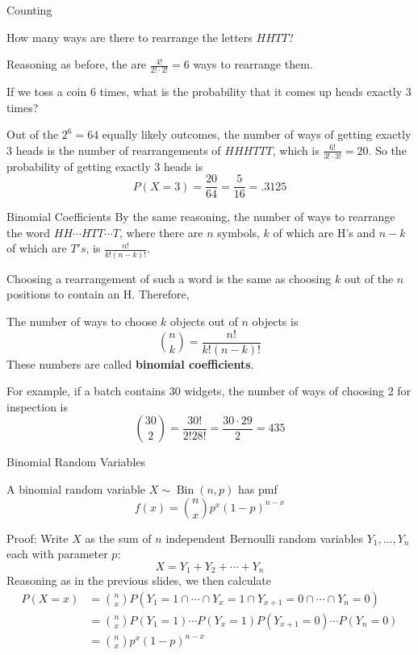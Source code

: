 \documentclass[xcolor=table]{beamer}
\DeclareMathOperator{\Bin}{Bin}
\renewcommand{\emph}{\textbf}
\begin{document}
\begin{frame}{Counting}
\begin{block}{}
How many ways are there to rearrange the letters $HHTT$?
\end{block}

\pause\vspace{.2cm}
Reasoning as before, the are $\frac{4!}{2!\cdot 2!} = 6$ ways to rearrange them.
\pause\begin{block}{}
If we toss a coin 6 times, what is the probability that it comes up heads exactly 3 times?
\end{block}
\pause Out of the $2^6=64$ equally likely outcomes, the number of ways of getting exactly 3 heads is the number of rearrangements of $HHHTTT$, which is $\frac{6!}{3!\cdot 3!} = 20$. So the probability of getting exactly 3 heads is
$$P(X=3) = \frac{20}{64} = \frac5{16} = .3125$$
\end{frame}

\begin{frame}{Binomial Coefficients}
By the same reasoning, the number of ways to rearrange the word $HH\cdots HTT\cdots T$, where there are $n$ symbols, $k$ of which are H's and $n-k$ of which are $T's$, is $\frac{n!}{k!(n-k)!}$.

\vspace{.2cm}
\pause Choosing a rearrangement of such a word is the same as choosing $k$ out of the $n$ positions to contain an H. \pause Therefore,

\begin{block}{}The number of ways to choose $k$ objects out of $n$ objects is
$$\binom n k = \frac{n!}{k!(n-k)!}$$
These numbers are called \emph{binomial coefficients}.
\end{block}

\pause For example, if a batch contains 30 widgets, the number of ways of choosing 2 for inspection is $$\binom{30}2 = \frac{30!}{2!28!} = \frac{30\cdot 29}{2} = 435$$
\end{frame}

\begin{frame}{Binomial Random Variables}
\begin{block}{}
A binomial random variable $X\sim \Bin(n,p)$ has pmf
$$f(x) = \binom{n}{x}p^x(1-p)^{n-x}$$
\end{block}
Proof: Write $X$ as the sum of $n$ independent Bernoulli random variables $Y_1, \dots, Y_n$ each with parameter $p$:
$$X=Y_1+Y_2+\cdots+Y_n$$
Reasoning as in the previous slides, we then calculate
\begin{align*}
P(X=x) &= \binom{n}{x}P(Y_1=1 \cap \cdots \cap Y_x=1 \cap Y_{x+1}=0 \cap \cdots \cap Y_n=0)\\
&= \binom{n}{x}P(Y_1=1)\cdots P(Y_x=1)P(Y_{x+1}=0)\cdots P(Y_n=0) \\
&= \binom{n}{x}p^x(1-p)^{n-x}
\end{align*}
\end{frame}
\end{document}
